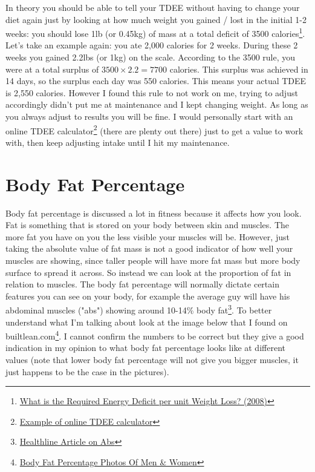 \documentclass[openany, 12pt]{book}
\begin{document}
	In theory you should be able to tell your TDEE without having
	to change your diet again just by looking at how much weight you gained / lost in the initial 1-2 weeks: you should lose 1lb (or 0.45kg) of mass at 
	a total deficit of 3500 calories\footnote{\href{https://www.ncbi.nlm.nih.gov/pmc/articles/PMC2376744/}{What is the Required Energy Deficit per 
	unit Weight Loss? (2008)}}. Let's take an example again: you ate 2,000 calories for 2 weeks. During these 2 weeks you gained 2.2lbs (or 1kg) on the
	scale. According to the 3500 rule, you were at a total surplus of $3500 \times 2.2 = 7700$ calories. This surplus was achieved in 14 days, so the
	surplus each day was 550 calories. This means your actual TDEE is 2,550 calories. However I found this rule to not work on me, trying to adjust 
	accordingly didn't put me at maintenance and I kept changing weight. As long as you always adjust to results you will be fine. I would personally
	start with an online TDEE calculator\footnote{\href{https://tdeecalculator.net/}{Example of online TDEE calculator}} (there are plenty out there) 
	just to get a value to work with, then keep adjusting intake until I hit my maintenance.
	
	
	\section{Body Fat Percentage}
	
	Body fat percentage is discussed a lot in fitness because it affects how you look. Fat is something that is stored on your body between skin and muscles. The more fat you have on you the less visible your muscles will be. However, just taking the absolute value of fat mass is not a good indicator of how well your muscles are showing, since taller people will have more fat mass but more body surface to spread it across. So instead we can look at the proportion of fat in relation to muscles. The body fat percentage will normally dictate certain features you can see on your body, for example the average guy will have his abdominal muscles ("abs") showing around 10-14\% body fat\footnote{\href{https://www.healthline.com/health/body-fat-percentage-for-abs}{Healthline Article on Abs}}. To better understand what I'm talking about look at the image below that I found on builtlean.com\footnote{\href{https://www.builtlean.com/body-fat-percentage-men-women/}{Body Fat Percentage Photos Of Men \& Women}}. I cannot confirm the numbers to be correct but they give a good indication in my opinion to what body fat percentage looks like at different values (note that lower body fat percentage will not give you bigger muscles, it just happens to be the case in the pictures).
	
\end{document}
